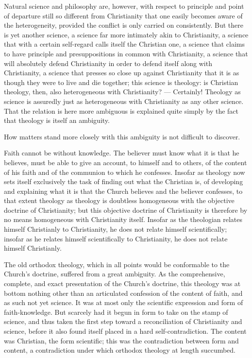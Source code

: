 \documentclass[12pt,a4paper]{book}
\begin{document}
Natural science and philosophy are, however, with respect to principle and
point of departure still so different from Christianity that one easily becomes
aware of the heterogeneity, provided the conflict is only carried on
consistently. But there is yet another science, a science far more intimately
akin to Christianity, a science that with a certain self-regard calls itself
the Christian one, a science that claims to have principle and presuppositions
in common with Christianity, a science that will absolutely defend Christianity
in order to defend itself along with Christianity, a science that presses so
close up against Christianity that it is as though they were to live and die
together;
this science is theology: is Christian theology, then, also heterogeneous with
Christianity? --- Certainly! Theology as science is assuredly just as
heterogeneous with Christianity as any other science. That the relation is here
more ambiguous is explained quite simply by the fact that theology is itself an
ambiguity.

How matters stand more closely with this ambiguity is not difficult to
discover.

Faith cannot be without knowledge. The believer must know what it is that he
believes, must be able to give an account, to himself and to others, of the
content of his faith and of the communion to which he confesses. Insofar as
theology now sets itself exclusively the task of finding out what the Christian
is, of developing and explaining what it is that the Church believes and the
believer confesses, to that extent theology as theology is doubtless
homogeneous with the objective doctrine of Christianity; but this objective
doctrine of Christianity is therefore by no means homogeneous with Christianity
itself. Insofar as the theologian relates himself Christianly to Christianity,
he does not relate himself scientifically; insofar as he relates himself
scientifically to Christianity, he does not relate himself Christianly.

The old orthodox theology, which in all points would be conformable to the
Church's doctrine, suffered from a great ambiguity. As the comprehensive,
complete, and exact presentation of the Church's doctrine, this theology was at
bottom nothing other than an articulated confession of the content of faith,
and as such not yet science. It was at most only the scientific expression and
form of faith-knowledge. But scarcely had it begun in form to take on the
stamp of science, and thus taken the first step toward a reconciliation of
Christianity and science, before it also found itself placed in a hard
self-contradiction. The content was Christian, the form scientific; this was
the contradiction between
form and content, a contradiction under which orthodox theology at length
succumbed.
\end{document}
